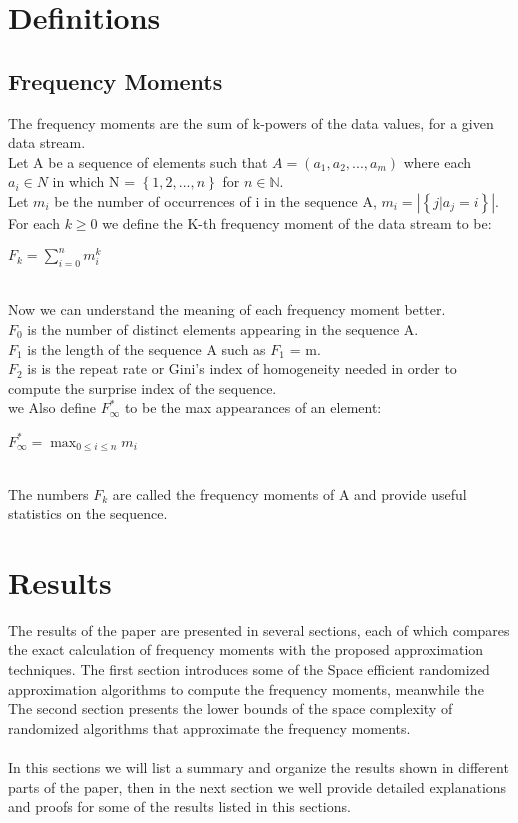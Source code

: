 \documentclass{article}
\begin{document}
\section{Definitions}
\subsection{Frequency Moments}

The frequency moments are the sum of k-powers of the data values, for a given data stream.\\
Let A be a sequence of elements such that \(A = (a_{1}, a_{2}, ..., a_{m}) \) where each \(a_{i} \in N\) in which N = \(\left\{ 1, 2, ..., n \right\}\) for \(n \in \mathbb{N}\). \\
Let \(m_{i}\) be the number of occurrences of i in the sequence A,  \(m_{i} = |\left\{j| a_{j} = i \right\}| \). \\
For each \(k \geq 0\) we define the K-th frequency moment of the data stream to be:
\begin{center}
    \(F_{k} = \sum_{i = 0}^{n} m_{i}^{k}\)
\end{center}
\\  
Now we can understand the meaning of each frequency moment better.\\
\(F_{0}\) is the number of distinct elements appearing in the sequence A.\\
\(F_{1}\) is the length of the sequence A such as \(F_{1}\) = m.\\
\(F_{2}\) is is the repeat rate or Gini’s index of homogeneity needed in order to
compute the surprise index of the sequence.\\
we Also define \(F_{\infty }^{\ast} \) to be the max appearances of an element:
\begin{center}
    \(F_{\infty }^{\ast } = \displaystyle\max_{ 0 \leq i \leq n} m_{i}\)
\end{center}
\\  
The numbers \(F_{k}\) are called the frequency moments of A and provide useful statistics on the sequence.

\section{Results}
The results of the paper are presented in several sections, each of which compares the exact calculation of frequency moments with the proposed approximation techniques. The first section introduces some of the Space efficient randomized approximation algorithms to compute the frequency moments, meanwhile the The second section presents the lower bounds of the space complexity of randomized algorithms that approximate the frequency moments.\\\\
In this sections we will list a summary and organize the results shown in different parts of the paper, then in the next section we well provide detailed explanations and proofs for some of the results listed in this sections.
\end{document}
